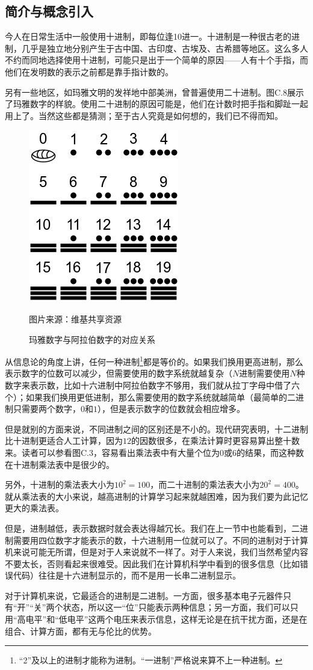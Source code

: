 \subsection*{简介与概念引入}
今人在日常生活中一般使用十进制，即每位逢10进一。十进制是一种很古老的进制，几乎是独立地分别产生于古中国、古印度、古埃及、古希腊等地区。这么多人不约而同地选择使用十进制，可能只是出于一个简单的原因——人有十个手指，而他们在发明数的表示之前都是靠手指计数的。\par
另有一些地区，如玛雅文明的发祥地中部美洲，曾普遍使用二十进制。图C.8展示了玛雅数字的样貌。使用二十进制的原因可能是，他们在计数时把手指和脚趾一起用上了。当然这些都是猜测；至于古人究竟是如何想的，我们已不得而知。\par
\begin{figure}[htbp]
    \centering
    \includegraphics[width=.3\textwidth]{../images/other_parts/C_maya_numbers.png}
    \caption{玛雅数字与阿拉伯数字的对应关系}
    \footnotesize{图片来源：维基共享资源}
\end{figure}
从信息论的角度上讲，任何一种进制\footnote{``2''及以上的进制才能称为进制。``一进制''严格说来算不上一种进制。}都是等价的。如果我们换用更高进制，那么表示数字的位数可以减少，但需要使用的数字系统就越复杂（$N$进制需要使用$N$种数字来表示数，比如十六进制中阿拉伯数字不够用，我们就从拉丁字母中借了六个）；如果我们换用更低进制，那么需要使用的数字系统就越简单（最简单的二进制只需要两个数字，$0$和$1$），但是表示数字的位数就会相应增多。\par
但是就别的方面来说，不同进制之间的区别还是不小的。现代研究表明，十二进制比十进制更适合人工计算，因为$12$的因数很多，在乘法计算时更容易算出整十数来。读者可以参看图C.3，容易看出乘法表中有大量个位为$0$或$6$的结果，而这种数在十进制乘法表中是很少的。\par
另外，十进制的乘法表大小为$10^2=100$，而二十进制的乘法表大小为$20^2=400$。就从乘法表的大小来说，越高进制的计算学习起来就越困难，因为我们要为此记忆更大的乘法表。\par
但是，进制越低，表示数据时就会表达得越冗长。我们在上一节中也能看到，二进制需要用四位数字才能表示的数，十六进制用一位就可以了。不同的进制对于计算机来说可能无所谓，但是对于人来说就不一样了。对于人来说，我们当然希望内容不要太长，否则看起来很难受。因此我们在计算机科学中看到的很多信息（比如错误代码）往往是十六进制显示的，而不是用一长串二进制显示。\par
对于计算机来说，它最适合的进制是二进制。一方面，很多基本电子元器件只有``开''``关''两个状态，所以这一``位''只能表示两种信息；另一方面，我们可以只用``高电平''和``低电平''这两个电压来表示信息，这样无论是在抗干扰方面，还是在组合、计算方面，都有无与伦比的优势。\par